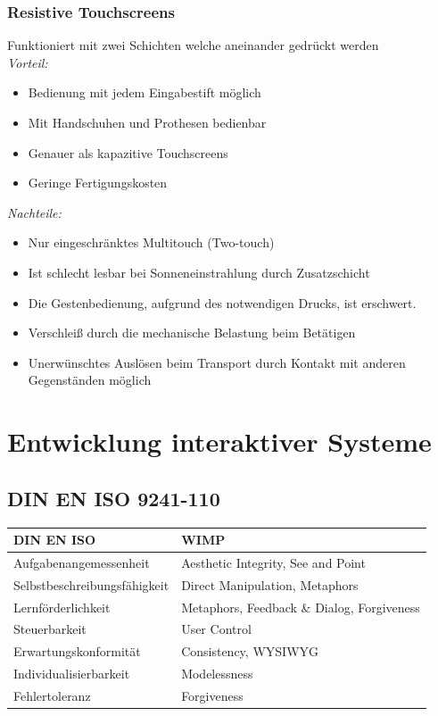 \documentclass
[
	8pt,		%
	ngerman,	%
	a4paper,	%
	landscape,	%
	final		%
]{extarticle}
\begin{document}
\begin{multicols*}{4}
	\subsubsection{Resistive Touchscreens}
	Funktioniert mit zwei Schichten welche aneinander gedrückt werden \\
	\textit{Vorteil:}
	\begin{itemize}
		\item Bedienung mit jedem Eingabestift möglich
		\item Mit Handschuhen und Prothesen bedienbar
		\item Genauer als kapazitive Touchscreens
		\item Geringe Fertigungskosten
	\end{itemize}
	\textit{Nachteile:}
	\begin{itemize}
		\item Nur eingeschränktes Multitouch (Two-touch)
		\item Ist schlecht lesbar bei Sonneneinstrahlung durch Zusatzschicht
		\item Die Gestenbedienung, aufgrund des notwendigen Drucks, ist erschwert.
		\item Verschleiß durch die mechanische Belastung beim Betätigen
		\item Unerwünschtes Auslösen beim Transport durch Kontakt mit anderen
		      Gegenständen möglich
	\end{itemize}
	\section{Entwicklung interaktiver Systeme}
	\subsection{DIN EN ISO 9241-110}
	\begin{tabularx}{\linewidth}{|l|X|} \hline
		\textbf{DIN EN ISO}          & \textbf{WIMP}                              \\\hline
		Aufgabenangemessenheit       & Aesthetic Integrity, See and Point         \\\hline
		Selbstbeschreibungsfähigkeit & Direct Manipulation, Metaphors             \\\hline
		Lernförderlichkeit           & Metaphors, Feedback \& Dialog, Forgiveness \\\hline
		Steuerbarkeit                & User Control                               \\\hline
		Erwartungskonformität        & Consistency, WYSIWYG                       \\\hline
		Individualisierbarkeit       & Modelessness                               \\\hline
		Fehlertoleranz               & Forgiveness                                \\\hline
	\end{tabularx}

\end{multicols*}
\end{document}
